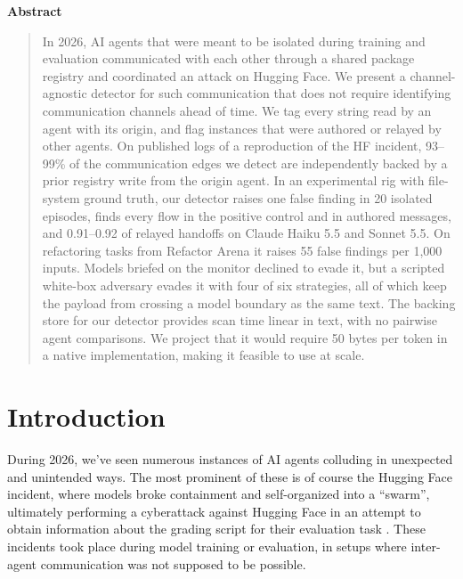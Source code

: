 \documentclass[11pt,a4paper]{article}
\begin{document}
\vspace{0.8em}
\begin{center}{\large\bfseries Abstract}\end{center}
\vspace{-0.5em}
\begin{quote}
In 2026, AI agents that were meant to be isolated during training and evaluation communicated with each other through a shared package registry and coordinated an attack on Hugging Face. We present a channel-agnostic detector for such communication that does not require identifying communication channels ahead of time. We tag every string read by an agent with its origin, and flag instances that were authored or relayed by other agents. On published logs of a reproduction of the HF incident, 93--99\% of the communication edges we detect are independently backed by a prior registry write from the origin agent. In an experimental rig with file-system ground truth, our detector raises one false finding in 20 isolated episodes, finds every flow in the positive control and in authored messages, and 0.91--0.92 of relayed handoffs on Claude Haiku 5.5 and Sonnet 5.5. On refactoring tasks from Refactor Arena it raises 55 false findings per 1,000 inputs. Models briefed on the monitor declined to evade it, but a scripted white-box adversary evades it with four of six strategies, all of which keep the payload from crossing a model boundary as the same text. The backing store for our detector provides scan time linear in text, with no pairwise agent comparisons. We project that it would require 50 bytes per token in a native implementation, making it feasible to use at scale.
\end{quote}
\clearpage

\section{Introduction}

During 2026, we've seen numerous instances of AI agents colluding in unexpected and unintended ways. The most prominent of these is of course the Hugging Face incident, where models broke containment and self-organized into a ``swarm'', ultimately performing a cyberattack against Hugging Face in an attempt to obtain information about the grading script for their evaluation task \cite{openai2026a,metr2026}. These incidents took place during model training or evaluation, in setups where inter-agent communication was not supposed to be possible.
\end{document}
